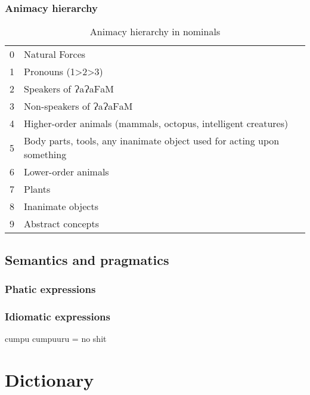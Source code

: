 \documentclass[a4paper,10pt,twoside,openright,draft]{memoir}
\newcommand{\lang}{ɁaɁa\textsc{F}a\textsc{M}}
\begin{document}
\section{Animacy hierarchy}

\begin{table}[ht]
    \centering
    \begin{tabular}{ll}
    0 & Natural Forces \\
    1 & Pronouns (1>2>3) \\
    2 & Speakers of \lang{} \\
    3 & Non-speakers of \lang{} \\
    4 & Higher-order animals (mammals, octopus, intelligent creatures) \\
    5 & \parbox[t]{7cm}{Body parts, tools, any inanimate object used for acting upon something} \\
    6 & Lower-order animals \\
    7 & Plants \\
    8 & Inanimate objects \\
    9 & Abstract concepts 
    \end{tabular}
    \caption{Animacy hierarchy in nominals}
    \label{tab:hierarchy}
\end{table}

\chapter{Semantics and pragmatics}
\section{Phatic expressions}
\section{Idiomatic expressions}

cumpu cumpuuru = no shit

\part{Dictionary}
\end{document}
